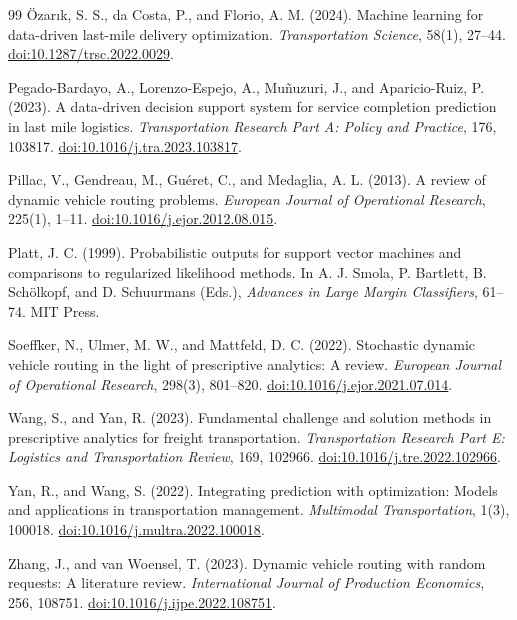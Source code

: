 \documentclass[11pt,a4paper]{article}
\begin{document}
\begin{thebibliography}{99}
\"Ozar\i k, S. S., da Costa, P., and Florio, A. M. (2024).
Machine learning for data-driven last-mile delivery optimization.
\emph{Transportation Science}, 58(1), 27--44.
\href{https://doi.org/10.1287/trsc.2022.0029}{doi:10.1287/trsc.2022.0029}.

Pegado-Bardayo, A., Lorenzo-Espejo, A., Mu\~nuzuri, J., and Aparicio-Ruiz, P. (2023).
A data-driven decision support system for service completion prediction in last mile logistics.
\emph{Transportation Research Part A: Policy and Practice}, 176, 103817.
\href{https://doi.org/10.1016/j.tra.2023.103817}{doi:10.1016/j.tra.2023.103817}.

Pillac, V., Gendreau, M., Gu\'eret, C., and Medaglia, A. L. (2013).
A review of dynamic vehicle routing problems.
\emph{European Journal of Operational Research}, 225(1), 1--11.
\href{https://doi.org/10.1016/j.ejor.2012.08.015}{doi:10.1016/j.ejor.2012.08.015}.

Platt, J. C. (1999).
Probabilistic outputs for support vector machines and comparisons to regularized likelihood methods.
In A. J. Smola, P. Bartlett, B. Sch\"olkopf, and D. Schuurmans (Eds.), \emph{Advances in Large Margin Classifiers}, 61--74. MIT Press.

Soeffker, N., Ulmer, M. W., and Mattfeld, D. C. (2022).
Stochastic dynamic vehicle routing in the light of prescriptive analytics: A review.
\emph{European Journal of Operational Research}, 298(3), 801--820.
\href{https://doi.org/10.1016/j.ejor.2021.07.014}{doi:10.1016/j.ejor.2021.07.014}.

Wang, S., and Yan, R. (2023).
Fundamental challenge and solution methods in prescriptive analytics for freight transportation.
\emph{Transportation Research Part E: Logistics and Transportation Review}, 169, 102966.
\href{https://doi.org/10.1016/j.tre.2022.102966}{doi:10.1016/j.tre.2022.102966}.

Yan, R., and Wang, S. (2022).
Integrating prediction with optimization: Models and applications in transportation management.
\emph{Multimodal Transportation}, 1(3), 100018.
\href{https://doi.org/10.1016/j.multra.2022.100018}{doi:10.1016/j.multra.2022.100018}.

Zhang, J., and van Woensel, T. (2023).
Dynamic vehicle routing with random requests: A literature review.
\emph{International Journal of Production Economics}, 256, 108751.
\href{https://doi.org/10.1016/j.ijpe.2022.108751}{doi:10.1016/j.ijpe.2022.108751}.


\end{thebibliography}
\end{document}
